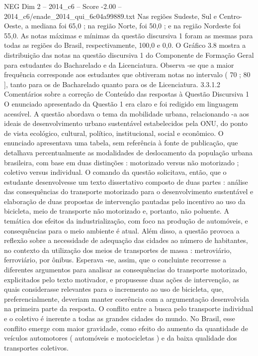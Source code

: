 \begin{textsample}{NEG Dim 2 – 2014\_c6 – Score -2.00 – 2014\_c6/enade\_2014\_qui\_6c04a99889.txt}
Nas regiões Sudeste, Sul e Centro-Oeste, a mediana foi 65,0 ; na região Norte, foi 50,0 ; e na região Nordeste foi 55,0.
As notas máximas e mínimas da questão discursiva 1 foram as mesmas para todas as regiões do Brasil, respectivamente, 100,0 e 0,0.
O Gráfico 3.8 mostra a distribuição das notas na questão discursiva 1 do Componente de Formação Geral para estudantes do Bacharelado e da Licenciatura.
Observa -se que a maior frequência corresponde aos estudantes que obtiveram notas no intervalo ( 70 ; 80 ], tanto para os de Bacharelado quanto para os de Licenciatura. 3.3.1.2 Comentários sobre a correção de Conteúdo das respostas à Questão Discursiva 1 O enunciado apresentado da Questão 1 era claro e foi redigido em linguagem acessível.
A questão abordava o tema da mobilidade urbana, relacionando -a aos ideais de desenvolvimento urbano sustentável estabelecidos pela ONU, do ponto de vista ecológico, cultural, político, institucional, social e econômico.
O enunciado apresentava uma tabela, sem referência à fonte de publicação, que detalhava percentualmente as modalidades de deslocamento da população urbana brasileira, com base em duas distinções : motorizado versus não motorizado ; coletivo versus individual.
O comando da questão solicitava, então, que o estudante desenvolvesse um texto dissertativo composto de duas partes : análise das consequências do transporte motorizado para o desenvolvimento sustentável e elaboração de duas propostas de intervenção pautadas pelo incentivo ao uso da bicicleta, meio de transporte não motorizado e, portanto, não poluente.
A temática dos efeitos da industrialização, com foco na produção de automóveis, e consequências para o meio ambiente é atual.
Além disso, a questão provoca a reflexão sobre a necessidade de adequação das cidades ao número de habitantes, no contexto da utilização dos meios de transportes de massa : metroviário, ferroviário, por ônibus.
Esperava -se, assim, que o concluinte recorresse a diferentes argumentos para analisar as consequências do transporte motorizado, explicitados pelo texto motivador, e propusesse duas ações de intervenção, as quais considerasse relevantes para o incremento ao uso de bicicleta, que, preferencialmente, deveriam manter coerência com a argumentação desenvolvida na primeira parte da resposta.
O conflito entre a busca pelo transporte individual e o coletivo é inerente a todas as grandes cidades do mundo.
No Brasil, esse conflito emerge com maior gravidade, como efeito do aumento da quantidade de veículos automotores ( automóveis e motocicletas ) e da baixa qualidade dos transportes coletivos.

\end{textsample}
